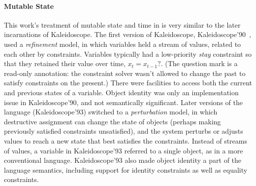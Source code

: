 \paragraph{Mutable State}
This work's treatment of mutable state and time in \langname is very
similar to the later incarnations of Kaleidoscope. The first version
of Kaleidoscope, Kaleidoscope'90~\cite{freeman-benson-iccl-1992}, used
a \emph{refinement} model, in which variables held a stream of values,
related to each other by constraints.  Variables typically had a
low-priority \emph{stay} constraint so that they retained their value
over time, \eg \mbox{$x_t = x_{t-1}?$}.  (The question mark is a
read-only annotation: the constraint solver wasn't allowed to change
the past to satisfy constraints on the present.)  There were
facilities to access both the current and previous states of a
variable.  Object identity was only an implementation issue in
Kaleidoscope'90, and not semantically significant.
Later versions of the language (\eg Kaleidoscope'93)
\cite{lopez-ecoop-1994,lopez-oopsla-1994} switched to a
\emph{perturbation} model, in which destructive assignment can change
the state of objects (perhaps making previously satisfied constraints
unsatisfied), and the system perturbs or adjusts values to reach a new
state that best satisfies the constraints. Instead of streams of
values, a variable in Kaleidoscope'93 referred to a single object, as
in a more conventional language.  Kaleidoscope'93 also made object
identity a part of the language semantics, including support for
identity constraints as well as equality constraints.





